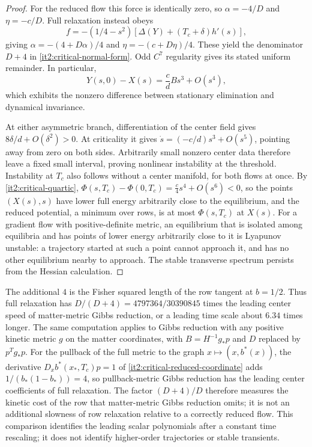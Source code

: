 \begin{proof}
For the reduced flow this force is identically zero, so $\alpha=-4/D$ and $\eta=-c/D$. Full relaxation instead obeys
\begin{equation}
 f=-(1/4-s^2)[\Delta(Y)+(T_c+\delta)h'(s)],
 \label{it2:critical-full-row}
\end{equation}
giving $\alpha=-(4+D\alpha)/4$ and $\eta=-(c+D\eta)/4$. These yield the denominator $D+4$ in \cref{it2:critical-normal-form}. Odd $C^7$ regularity gives its stated uniform remainder. In particular,
\begin{equation}
 Y(s,0)-X(s)=\frac{c}{d}B s^3+O(s^4),
 \label{it2:critical-graph-difference}
\end{equation}
which exhibits the nonzero difference between stationary elimination and dynamical invariance.

At either asymmetric branch, differentiation of the center field gives $8\delta/d+O(\delta^2)>0$. At criticality it gives $\dot s=(-c/d)s^3+O(s^5)$, pointing away from zero on both sides. Arbitrarily small nonzero center data therefore leave a fixed small interval, proving nonlinear instability at the threshold. Instability at $T_c$ also follows without a center manifold, for both flows at once. By \cref{it2:critical-quartic}, $\Phi(s,T_c)-\Phi(0,T_c)=\frac c4s^4+O(s^6)<0$, so the points $(X(s),s)$ have lower full energy arbitrarily close to the equilibrium, and the reduced potential, a minimum over rows, is at most $\Phi(s,T_c)$ at $X(s)$. For a gradient flow with positive-definite metric, an equilibrium that is isolated among equilibria and has points of lower energy arbitrarily close to it is Lyapunov unstable: a trajectory started at such a point cannot approach it, and has no other equilibrium nearby to approach. The stable transverse spectrum persists from the Hessian calculation.
\end{proof}

The additional $4$ is the Fisher squared length of the row tangent at $b=1/2$. Thus full relaxation has $D/(D+4)=4797364/30390845$ times the leading center speed of matter-metric Gibbs reduction, or a leading time scale about $6.34$ times longer. The same computation applies to Gibbs reduction with any positive kinetic metric $g$ on the matter coordinates, with $B=H^{-1}g_*p$ and $D$ replaced by $p^Tg_*p$. For the pullback of the full metric to the graph $x\mapsto(x,b^*(x))$, the derivative $D_xb^*(x_*,T_c)p=1$ of \cref{it2:critical-reduced-coordinate} adds $1/(b_*(1-b_*))=4$, so pullback-metric Gibbs reduction has the leading center coefficients of full relaxation. The factor $(D+4)/D$ therefore measures the kinetic cost of the row that matter-metric Gibbs reduction omits; it is not an additional slowness of row relaxation relative to a correctly reduced flow. This comparison identifies the leading scalar polynomials after a constant time rescaling; it does not identify higher-order trajectories or stable transients.

